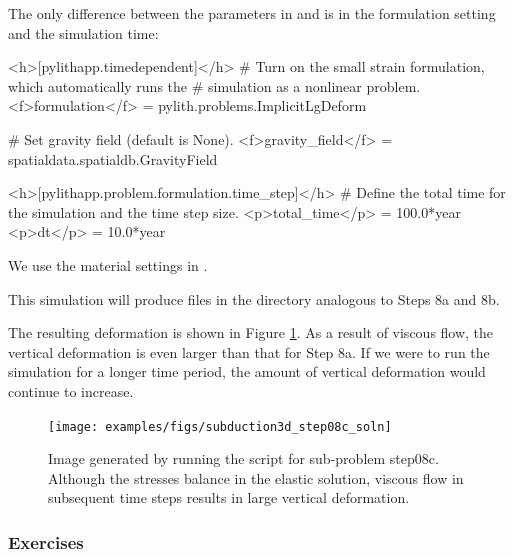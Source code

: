 The only difference between the parameters in 
and  is in the formulation setting and the
simulation time:
\begin{cfg}
<h>[pylithapp.timedependent]</h>
# Turn on the small strain formulation, which automatically runs the
# simulation as a nonlinear problem.
<f>formulation</f> = pylith.problems.ImplicitLgDeform

# Set gravity field (default is None).
<f>gravity_field</f> = spatialdata.spatialdb.GravityField

<h>[pylithapp.problem.formulation.time_step]</h>
# Define the total time for the simulation and the time step size.
<p>total_time</p> = 100.0*year
<p>dt</p> = 10.0*year
\end{cfg}
We use the material settings in .
This simulation will produce files in the  directory
analogous to Steps 8a and 8b.

The resulting deformation is shown in Figure
\ref{fig:example:subduction:3d:step08c}. As a result of viscous flow,
the vertical deformation is even larger than that for Step 8a. If we
were to run the simulation for a longer time period, the amount of
vertical deformation would continue to increase.

\begin{figure}
  \texttt{[image: examples/figs/subduction3d\_step08c\_soln]}
  \caption{Image generated by running the 
    script for sub-problem step08c. Although the stresses balance in
    the elastic solution, viscous flow in subsequent time steps
    results in large vertical deformation.}
  \label{fig:example:subduction:3d:step08c}
\end{figure}

\subsubsection{Exercises}

